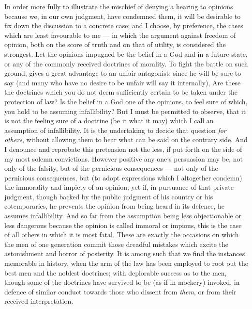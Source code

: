 \documentclass[12pt]{report}
\begin{document}
In order more fully to illustrate the mischief of denying a hearing to opinions because we, in our own judgment, have condemned them, it will be desirable to fix down the discussion to a concrete case; and I choose, by preference, the cases which are least favourable to me — in which the argument against freedom of opinion, both on the score of truth and on that of utility, is considered the strongest. Let the opinions impugned be the belief in a God and in a future state, or any of the commonly received doctrines of morality. To fight the battle on such ground, gives a great advantage to an unfair antagonist; since he will be sure to say (and many who have no desire to be unfair will say it internally), Are these the doctrines which you do not deem sufficiently certain to be taken under the protection of law? Is the belief in a God one of the opinions, to feel sure of which, you hold to be assuming infallibility? But I must be permitted to observe, that it is not the feeling sure of a doctrine (be it what it may) which I call an assumption of infallibility. It is the undertaking to decide that question \emph{for others}, without allowing them to hear what can be said on the contrary side. And I denounce and reprobate this pretension not the less, if put forth on the side of my most solemn convictions. However positive any one's persuasion may be, not only of the falsity, but of the pernicious consequences — not only of the pernicious consequences, but (to adopt expressions which I altogether condemn) the immorality and impiety of an opinion; yet if, in pursuance of that private judgment, though backed by the public judgment of his country or his cotemporaries, he prevents the opinion from being heard in its defence, he assumes infallibility. And so far from the assumption being less objectionable or less dangerous because the opinion is called immoral or impious, this is the case of all others in which it is most fatal. These are exactly the occasions on which the men of one generation commit those dreadful mistakes which excite the astonishment and horror of posterity. It is among such that we find the instances memorable in history, when the arm of the law has been employed to root out the best men and the noblest doctrines; with deplorable success as to the men, though some of the doctrines have survived to be (as if in mockery) invoked, in defence of similar conduct towards those who dissent from \emph{them}, or from their received interpretation.
\end{document}
